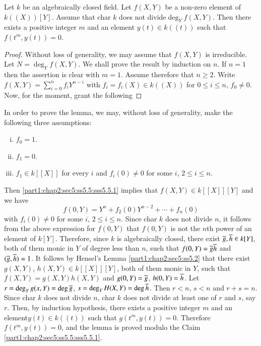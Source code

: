 Let $k$ be an algebraically closed field. Let $f(X, Y)$ be a non-zero element of $k ((X)) [Y]$. Assume that char $k$ does not divide\pageoriginale $\deg_Y f(X, Y)$. Then there exists a positive integer $m$ and an element $y(t) \in k ((t))$ such that $f(t^m, y(t))=0$.

\begin{proof}
  Without loss of generality, we may assume that $f(X, Y)$ is irreducible. Let $N= \deg_Y f(X, Y)$. We shall prove the result by induction on $n$. If $n=1$ then the assertion is clear with $m=1$. Assume therefore that $n \geq 2$. Write $\displaystyle{f(X, Y)=\sum^n_{i=0} f_i Y^{n-i}}$ with $f_i = f_i (X) \in k ((X))$ for $0 \leq i \leq n$, $f_0 \neq 0$. Now, for the moment, grant the following
\end{proof}

\begin{claim}\label{part1:chap2:sec5:ss5.5:sss5.5.1}
  In order to prove the lemma, we may, without loss of generality, make the following three assumptions:
\begin{enumerate}[(i)]
\item $f_0 =1$.
\item $f_1=0$.
\item $f_1 \in k [[X]]$ for every $i$ and $f_i (0) \neq 0$ for some $i$, $2 \leq i \leq n$.
\end{enumerate}
\end{claim}

Then \ref{part1:chap2:sec5:ss5.5:sss5.5.1} implies that $f(X, Y) \in  k [[X]][Y]$ and we have
$$
f(0, Y)= Y^n + f_2 (0) Y^{n-2} + \cdots + f_n (0)
$$
with $f_i (0) \neq 0$ for some $i$, $2 \leq i \leq n$. Since char $k$ does not divide $n$, it follows from the above expression for $f(0, Y)$ that $f(0, Y)$ is not the $n$th power of an element of $k[Y]$. Therefore, since $k$ is algebraically closed, there exist $\overline{g}, \overline{h} \in k [Y]$, both of them monic in $Y$ of degree less than $n$, such that $f(0, Y)= \overline{g} \overline{h}$ and \gcd $(\overline{g}, \overline{h})=1$. It follows by Hensel's Lemma \ref{part1:chap2:sec5:ss5.2} that there exist $g(X, Y)$, $h(X, Y) \in k [[X]][Y]$, both of them monic in $Y$, such that $f(X, Y)= g (X, Y) h (X, Y)$ and $g (0, Y)= \overline{g}$, $h (0, Y)= \overline{h}$. Let $r= \deg_Y g(x, Y)= \deg \overline{g}$, $s = \deg_Y H(X, Y)= \deg \overline{h}$. Then $r<n$, $s<n$ and $r+s=n$. Since char $k$ does not divide $n$, char $k$ does not divide at least one of $r$ and $s$, say $r$. Then, by induction hypothesis, there exists a positive integer $m$ and an element\pageoriginale $y(t) \in k((t))$ such that $g(t^m, y(t))=0$. Therefore $f(t^m, y(t))=0$, and the lemma is proved modulo the Claim \ref{part1:chap2:sec5:ss5.5:sss5.5.1}. 


